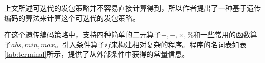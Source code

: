 上文所述可迭代的发包策略并不容易直接计算得到，所以作者提出了一种基于遗传编码的算法来计算这个可迭代的发包策略。

在这个遗传编码策略中，支持四种简单的二元算子$+,-,\times,\%$和一些常用的函数算子$abs,min,max$。引入条件算子$if$来构建相对复杂的程序。程序的名词表如表\ref{tab:terminal}所示，提供了从外部条件中获得的常量信息。


